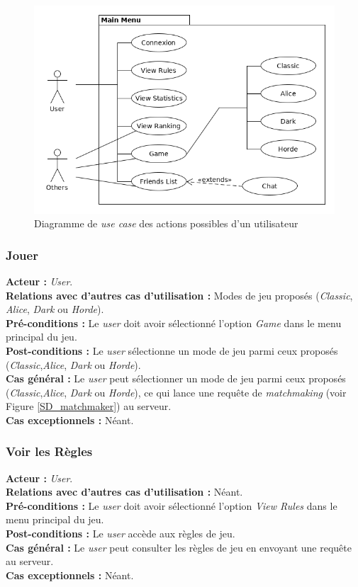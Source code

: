 \documentclass[10pt, a4paper]{article}
\begin{document}
\begin{figure}[ht]
\begin{center}
\includegraphics[scale=0.5]{UC_mainmenu.png}
\caption{Diagramme de \textit{use case} des actions possibles d'un utilisateur}
\label{UC_menu} %
\end{center}
\end{figure}

\subsubsection{Jouer}
\textbf{Acteur :} \textit{User}.\\
\textbf{Relations avec d'autres cas d'utilisation :} Modes de jeu proposés (\textit{Classic}, \textit{Alice}, \textit{Dark} ou \textit{Horde}).\\
\textbf{Pré-conditions :} Le \textit{user} doit avoir sélectionné l'option \textit{Game} dans le menu principal du jeu.\\
\textbf{Post-conditions :} Le  \textit{user} sélectionne un mode de jeu parmi ceux proposés (\textit{Classic},\textit{Alice}, \textit{Dark} ou \textit{Horde}).\\
\textbf{Cas général :} Le  \textit{user} peut sélectionner un mode de jeu parmi ceux proposés (\textit{Classic},\textit{Alice}, \textit{Dark} ou \textit{Horde}), ce qui lance une requête de \textit{matchmaking} (voir Figure \ref{SD_matchmaker}) au serveur.\\
\textbf{Cas exceptionnels :} Néant.



\subsubsection{Voir les Règles}
\textbf{Acteur :} \textit{User}.\\
\textbf{Relations avec d'autres cas d'utilisation :} Néant.\\
\textbf{Pré-conditions :} Le \textit{user} doit avoir sélectionné l'option \textit{View Rules} dans le menu principal du jeu.\\
\textbf{Post-conditions :} Le \textit{user} accède aux règles de jeu.\\
\textbf{Cas général :} Le \textit{user} peut consulter les règles de jeu en envoyant une requête au serveur.\\
\textbf{Cas exceptionnels :} Néant.
\end{document}
